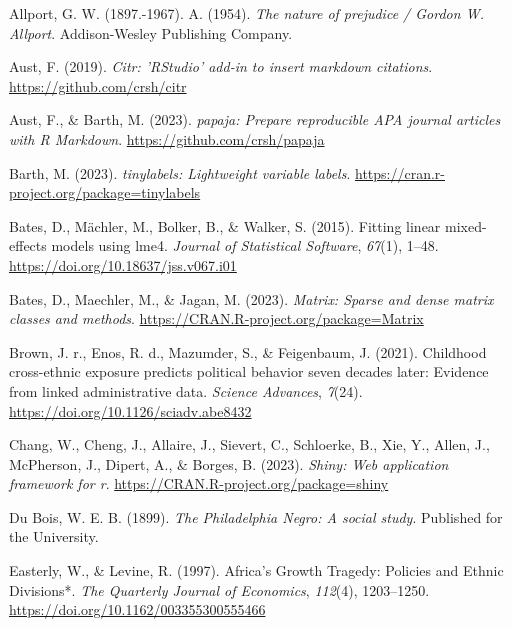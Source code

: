 \documentclass[
  man,floatsintext]{apa7}
\newlength{\cslhangindent}
\newlength{\cslentryspacingunit} %
\newenvironment{CSLReferences}[2] %
 {%
  \setlength{\parindent}{0pt}
  \ifodd #1
  \let\oldpar\par
  \def\par{\hangindent=\cslhangindent\oldpar}
  \fi
  \setlength{\parskip}{#2\cslentryspacingunit}
 }%
 {}
\begin{document}
\hypertarget{refs}{}
\begin{CSLReferences}{1}{0}
\leavevmode{}%
Allport, G. W. (1897.-1967). A. (1954). \emph{The nature of prejudice / {Gordon W}. {Allport}}. Addison-Wesley Publishing Company.

\leavevmode{}%
Aust, F. (2019). \emph{Citr: 'RStudio' add-in to insert markdown citations}. \url{https://github.com/crsh/citr}

\leavevmode{}%
Aust, F., \& Barth, M. (2023). \emph{{papaja}: {Prepare} reproducible {APA} journal articles with {R Markdown}}. \url{https://github.com/crsh/papaja}

\leavevmode{}%
Barth, M. (2023). \emph{{tinylabels}: Lightweight variable labels}. \url{https://cran.r-project.org/package=tinylabels}

\leavevmode{}%
Bates, D., Mächler, M., Bolker, B., \& Walker, S. (2015). Fitting linear mixed-effects models using {lme4}. \emph{Journal of Statistical Software}, \emph{67}(1), 1--48. \url{https://doi.org/10.18637/jss.v067.i01}

\leavevmode{}%
Bates, D., Maechler, M., \& Jagan, M. (2023). \emph{Matrix: Sparse and dense matrix classes and methods}. \url{https://CRAN.R-project.org/package=Matrix}

\leavevmode{}%
Brown, J. r., Enos, R. d., Mazumder, S., \& Feigenbaum, J. (2021). Childhood cross-ethnic exposure predicts political behavior seven decades later: {Evidence} from linked administrative data. \emph{Science Advances}, \emph{7}(24). \url{https://doi.org/10.1126/sciadv.abe8432}

\leavevmode{}%
Chang, W., Cheng, J., Allaire, J., Sievert, C., Schloerke, B., Xie, Y., Allen, J., McPherson, J., Dipert, A., \& Borges, B. (2023). \emph{Shiny: Web application framework for r}. \url{https://CRAN.R-project.org/package=shiny}

\leavevmode{}%
Du Bois, W. E. B. (1899). \emph{The {Philadelphia Negro}: {A} social study}. Published for the University.

\leavevmode{}%
Easterly, W., \& Levine, R. (1997). Africa's {Growth Tragedy}: {Policies} and {Ethnic Divisions}*. \emph{The Quarterly Journal of Economics}, \emph{112}(4), 1203--1250. \url{https://doi.org/10.1162/003355300555466}


\end{CSLReferences}
\end{document}
